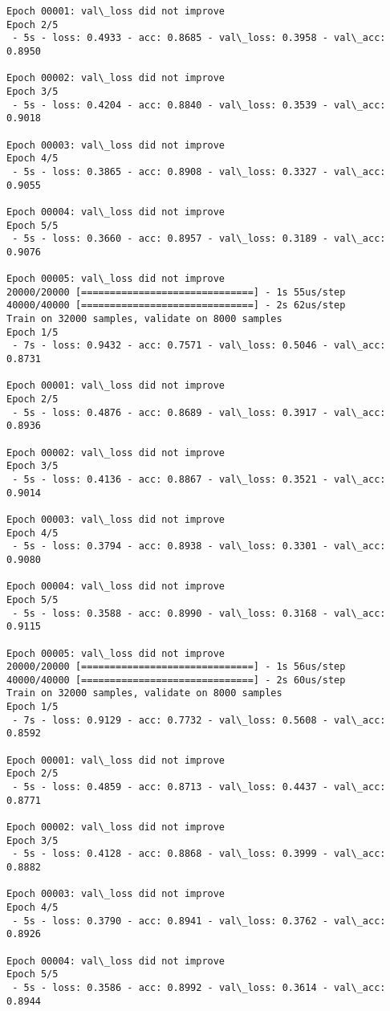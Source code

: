 \documentclass[11pt]{article}
\begin{document}
\begin{Verbatim}[commandchars=\\\{\}]
Epoch 00001: val\_loss did not improve
Epoch 2/5
 - 5s - loss: 0.4933 - acc: 0.8685 - val\_loss: 0.3958 - val\_acc: 0.8950

Epoch 00002: val\_loss did not improve
Epoch 3/5
 - 5s - loss: 0.4204 - acc: 0.8840 - val\_loss: 0.3539 - val\_acc: 0.9018

Epoch 00003: val\_loss did not improve
Epoch 4/5
 - 5s - loss: 0.3865 - acc: 0.8908 - val\_loss: 0.3327 - val\_acc: 0.9055

Epoch 00004: val\_loss did not improve
Epoch 5/5
 - 5s - loss: 0.3660 - acc: 0.8957 - val\_loss: 0.3189 - val\_acc: 0.9076

Epoch 00005: val\_loss did not improve
20000/20000 [==============================] - 1s 55us/step
40000/40000 [==============================] - 2s 62us/step
Train on 32000 samples, validate on 8000 samples
Epoch 1/5
 - 7s - loss: 0.9432 - acc: 0.7571 - val\_loss: 0.5046 - val\_acc: 0.8731

Epoch 00001: val\_loss did not improve
Epoch 2/5
 - 5s - loss: 0.4876 - acc: 0.8689 - val\_loss: 0.3917 - val\_acc: 0.8936

Epoch 00002: val\_loss did not improve
Epoch 3/5
 - 5s - loss: 0.4136 - acc: 0.8867 - val\_loss: 0.3521 - val\_acc: 0.9014

Epoch 00003: val\_loss did not improve
Epoch 4/5
 - 5s - loss: 0.3794 - acc: 0.8938 - val\_loss: 0.3301 - val\_acc: 0.9080

Epoch 00004: val\_loss did not improve
Epoch 5/5
 - 5s - loss: 0.3588 - acc: 0.8990 - val\_loss: 0.3168 - val\_acc: 0.9115

Epoch 00005: val\_loss did not improve
20000/20000 [==============================] - 1s 56us/step
40000/40000 [==============================] - 2s 60us/step
Train on 32000 samples, validate on 8000 samples
Epoch 1/5
 - 7s - loss: 0.9129 - acc: 0.7732 - val\_loss: 0.5608 - val\_acc: 0.8592

Epoch 00001: val\_loss did not improve
Epoch 2/5
 - 5s - loss: 0.4859 - acc: 0.8713 - val\_loss: 0.4437 - val\_acc: 0.8771

Epoch 00002: val\_loss did not improve
Epoch 3/5
 - 5s - loss: 0.4128 - acc: 0.8868 - val\_loss: 0.3999 - val\_acc: 0.8882

Epoch 00003: val\_loss did not improve
Epoch 4/5
 - 5s - loss: 0.3790 - acc: 0.8941 - val\_loss: 0.3762 - val\_acc: 0.8926

Epoch 00004: val\_loss did not improve
Epoch 5/5
 - 5s - loss: 0.3586 - acc: 0.8992 - val\_loss: 0.3614 - val\_acc: 0.8944


\end{Verbatim}
\end{document}
